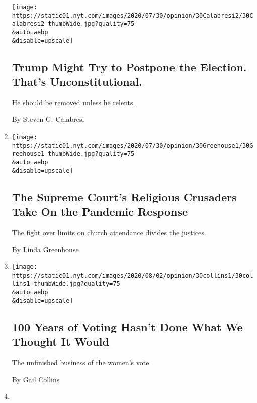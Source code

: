 \begin{enumerate}
  \texttt{[image: https://static01.nyt.com/images/2020/07/30/opinion/30Calabresi2/30Calabresi2-thumbWide.jpg?quality=75\\\&auto=webp\\\&disable=upscale]}

  \hypertarget{trump-might-try-to-postpone-the-election-thats-unconstitutional}{%
  \subsection{Trump Might Try to Postpone the Election. That's
  Unconstitutional.}\label{trump-might-try-to-postpone-the-election-thats-unconstitutional}}

  He should be removed unless he relents.

  By Steven G. Calabresi
\item
  \href{/2020/07/30/opinion/supreme-court-religion-coronavirus.html}{}

  \texttt{[image: https://static01.nyt.com/images/2020/07/30/opinion/30Greehouse1/30Greehouse1-thumbWide.jpg?quality=75\\\&auto=webp\\\&disable=upscale]}

  \hypertarget{the-supreme-courts-religious-crusaders-take-on-the-pandemic-response}{%
  \subsection{The Supreme Court's Religious Crusaders Take On the
  Pandemic
  Response}\label{the-supreme-courts-religious-crusaders-take-on-the-pandemic-response}}

  The fight over limits on church attendance divides the justices.

  By Linda Greenhouse
\item
  \href{/2020/07/30/opinion/sunday/19th-amendment-women-suffrage.html}{}

  \texttt{[image: https://static01.nyt.com/images/2020/08/02/opinion/30collins1/30collins1-thumbWide.jpg?quality=75\\\&auto=webp\\\&disable=upscale]}

  \hypertarget{100-years-of-voting-hasnt-done-what-we-thought-it-would}{%
  \subsection{100 Years of Voting Hasn't Done What We Thought It
  Would}\label{100-years-of-voting-hasnt-done-what-we-thought-it-would}}

  The unfinished business of the women's vote.

  By Gail Collins
\item
  \href{/2020/07/30/opinion/the-argument-authoritarianism-anne-applebaum.html}{}


\end{enumerate}
